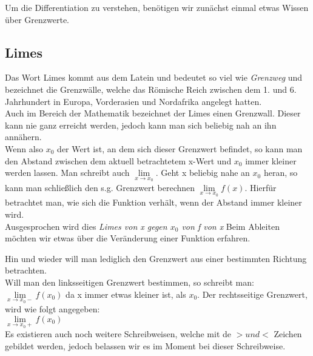 Um die Differentiation zu verstehen, benötigen wir zunächst einmal etwas Wissen über Grenzwerte.

\subsection{Limes}
Das Wort Limes kommt aus dem Latein und bedeutet so viel wie \textit{Grenzweg} und bezeichnet die Grenzwälle, welche das Römische Reich zwischen dem 1. und 6. Jahrhundert in Europa, Vorderasien und Nordafrika angelegt hatten.\\
Auch im Bereich der Mathematik bezeichnet der Limes einen Grenzwall. Dieser kann nie ganz erreicht werden, jedoch kann man sich beliebig nah an ihn annähern.\\
Wenn also $x_0$ der Wert ist, an dem sich dieser Grenzwert befindet, so kann man den Abstand zwischen dem aktuell betrachtetem x-Wert und $x_0$ immer kleiner werden lassen. Man schreibt auch $\lim\limits_{x \to x_0}$. Geht x beliebig nahe an $x_0$ heran, so kann man schließlich den s.g. Grenzwert berechnen $\lim\limits_{x \to x_0} f(x)$. Hierfür betrachtet man, wie sich die Funktion verhält, wenn der Abstand immer kleiner wird.\\
Ausgesprochen wird dies \textit{Limes von x gegen $x_0$ von f von x}
Beim Ableiten möchten wir etwas über die Veränderung einer Funktion erfahren.

\begin{warning}
	Hin und wieder will man lediglich den Grenzwert aus einer bestimmten Richtung betrachten.\\
	Will man den linksseitigen Grenzwert bestimmen, so schreibt man:\\
	$\lim\limits_{x \to x_0-} f(x_0)$ da x immer etwas kleiner ist, als $x_0$.
	Der rechtsseitige Grenzwert, wird wie folgt angegeben:\\
	$\lim\limits_{x \to x_0+} f(x_0)$\\
	Es existieren auch noch weitere Schreibweisen, welche mit de $> und <$ Zeichen gebildet werden, jedoch belassen wir es im Moment bei dieser Schreibweise.
\end{warning}

